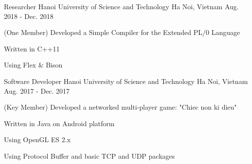 \begin{cventries}

\cventry
{Researcher} %
{Hanoi University of Science and Technology} %
{Ha Noi, Vietnam} %
{Aug. 2018 - Dec. 2018} %
{ %
\begin{cvitems}
\item{(One Member) Developed a Simple Compiler for the Extended PL/0 Language}
\item{Written in C++11}
\item{Using Flex \& Bison}
\end{cvitems}
}


\cventry
{Software Developer} %
{Hanoi University of Science and Technology} %
{Ha Noi, Vietnam} %
{Aug. 2017 - Dec. 2017} %
{ %
\begin{cvitems}
\item{(Key Member) Developed a networked multi-player game: "Chiec non ki dieu"}
\item{Written in Java on Android platform}
\item{Using OpenGL ES 2.x}
\item{Using Protocol Buffer and basic TCP and UDP packages}
\end{cvitems}
}


\end{cventries}
